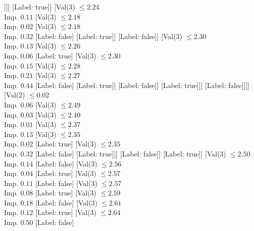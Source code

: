 \documentclass[margin=10pt]{standalone}
\begin{document}
\begin{forest}
															]]]
												[Label: true]]
											[Val($3$) $ \leq 2.24$ \\ Imp. $0.11$
												[Val($3$) $ \leq 2.18$ \\ Imp. $0.02$
													[Val($3$) $ \leq 2.18$ \\ Imp. $0.32$
														[Label: false]
														[Label: true]]
													[Label: false]]
												[Val($3$) $ \leq 2.30$ \\ Imp. $0.13$
													[Val($3$) $ \leq 2.26$ \\ Imp. $0.06$
														[Label: true]
														[Val($3$) $ \leq 2.30$ \\ Imp. $0.15$
															[Val($3$) $ \leq 2.28$ \\ Imp. $0.21$
																[Val($3$) $ \leq 2.27$ \\ Imp. $0.44$
																	[Label: false]
																	[Label: true]]
																[Label: false]]
															[Label: true]]]
													[Label: false]]]]
										[Val($2$) $ \leq 0.02$ \\ Imp. $0.06$
											[Val($3$) $ \leq 2.49$ \\ Imp. $0.03$
												[Val($3$) $ \leq 2.40$ \\ Imp. $0.01$
													[Val($3$) $ \leq 2.37$ \\ Imp. $0.13$
														[Val($3$) $ \leq 2.35$ \\ Imp. $0.02$
															[Label: true]
															[Val($3$) $ \leq 2.35$ \\ Imp. $0.32$
																[Label: false]
																[Label: true]]]
														[Label: false]]
													[Label: true]]
												[Val($3$) $ \leq 2.50$ \\ Imp. $0.14$
													[Label: false]
													[Val($3$) $ \leq 2.56$ \\ Imp. $0.04$
														[Label: true]
														[Val($3$) $ \leq 2.57$ \\ Imp. $0.11$
															[Label: false]
															[Val($3$) $ \leq 2.57$ \\ Imp. $0.08$
																[Label: true]
																[Val($3$) $ \leq 2.59$ \\ Imp. $0.18$
																	[Label: false]
																	[Val($3$) $ \leq 2.61$ \\ Imp. $0.12$
																		[Label: true]
																		[Val($3$) $ \leq 2.64$ \\ Imp. $0.50$
																			[Label: false]

\end{forest}
\end{document}
